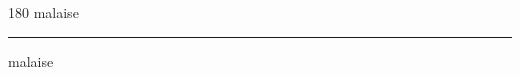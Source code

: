 
\begin{frame}
\begin{center}
\begin{turn}{180}
{\fontsize{2.5cm}{1em}\selectfont malaise}
\end{turn}
\vspace{1em}\par  
\hrule
\vspace{1em}\par  
{\fontsize{2.5cm}{1em}\selectfont malaise}
\end{center}
\end{frame}
